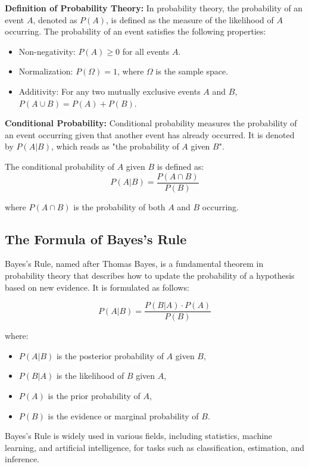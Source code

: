 \documentclass[12pt]{book} %
\begin{document}
\textbf{Definition of Probability Theory:} In probability theory, the probability of an event \(A\), denoted as \(P(A)\), is defined as the measure of the likelihood of \(A\) occurring. The probability of an event satisfies the following properties:
\begin{itemize}
    \item Non-negativity: \(P(A) \geq 0\) for all events \(A\).
    \item Normalization: \(P(\Omega) = 1\), where \(\Omega\) is the sample space.
    \item Additivity: For any two mutually exclusive events \(A\) and \(B\), \(P(A \cup B) = P(A) + P(B)\).
\end{itemize}

\textbf{Conditional Probability:} Conditional probability measures the probability of an event occurring given that another event has already occurred. It is denoted by \(P(A | B)\), which reads as "the probability of \(A\) given \(B\)".

The conditional probability of \(A\) given \(B\) is defined as:
\[ P(A | B) = \frac{P(A \cap B)}{P(B)} \]

where \(P(A \cap B)\) is the probability of both \(A\) and \(B\) occurring.

\subsection{The Formula of Bayes's Rule}
Bayes's Rule, named after Thomas Bayes, is a fundamental theorem in probability theory that describes how to update the probability of a hypothesis based on new evidence. It is formulated as follows:

\[ P(A | B) = \frac{P(B | A) \cdot P(A)}{P(B)} \]

where:
\begin{itemize}
    \item \(P(A | B)\) is the posterior probability of \(A\) given \(B\),
    \item \(P(B | A)\) is the likelihood of \(B\) given \(A\),
    \item \(P(A)\) is the prior probability of \(A\),
    \item \(P(B)\) is the evidence or marginal probability of \(B\).
\end{itemize}

Bayes's Rule is widely used in various fields, including statistics, machine learning, and artificial intelligence, for tasks such as classification, estimation, and inference.
\end{document}
